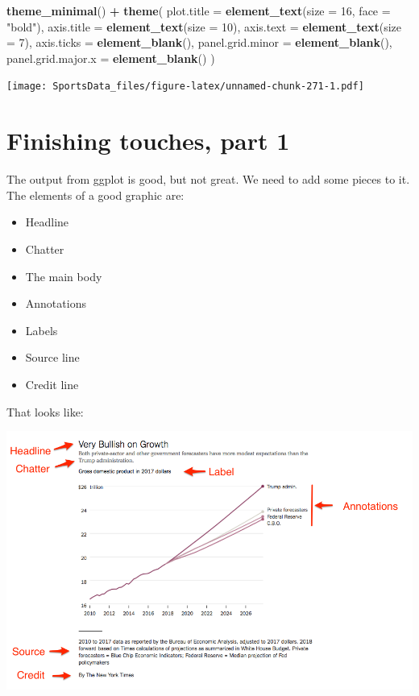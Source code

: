 \documentclass[
]{book}
\newenvironment{Shaded}{\begin{snugshade}}{\end{snugshade}}
\newcommand{\DataTypeTok}[1]{\textcolor[rgb]{0.13,0.29,0.53}{#1}}
\newcommand{\DecValTok}[1]{\textcolor[rgb]{0.00,0.00,0.81}{#1}}
\newcommand{\KeywordTok}[1]{\textcolor[rgb]{0.13,0.29,0.53}{\textbf{#1}}}
\newcommand{\NormalTok}[1]{#1}
\newcommand{\OperatorTok}[1]{\textcolor[rgb]{0.81,0.36,0.00}{\textbf{#1}}}
\newcommand{\StringTok}[1]{\textcolor[rgb]{0.31,0.60,0.02}{#1}}
\providecommand{\tightlist}{%
  \setlength{\itemsep}{0pt}\setlength{\parskip}{0pt}}
\begin{document}
\begin{Shaded}
\begin{Highlighting}[]
\StringTok{  }\KeywordTok{theme_minimal}\NormalTok{() }\OperatorTok{+}\StringTok{ }
\StringTok{  }\KeywordTok{theme}\NormalTok{(}
    \DataTypeTok{plot.title =} \KeywordTok{element_text}\NormalTok{(}\DataTypeTok{size =} \DecValTok{16}\NormalTok{, }\DataTypeTok{face =} \StringTok{"bold"}\NormalTok{),}
    \DataTypeTok{axis.title =} \KeywordTok{element_text}\NormalTok{(}\DataTypeTok{size =} \DecValTok{10}\NormalTok{),}
    \DataTypeTok{axis.text =} \KeywordTok{element_text}\NormalTok{(}\DataTypeTok{size =} \DecValTok{7}\NormalTok{),}
    \DataTypeTok{axis.ticks =} \KeywordTok{element_blank}\NormalTok{(),}
    \DataTypeTok{panel.grid.minor =} \KeywordTok{element_blank}\NormalTok{(),}
    \DataTypeTok{panel.grid.major.x =} \KeywordTok{element_blank}\NormalTok{()}
\NormalTok{  )}
\end{Highlighting}
\end{Shaded}

\texttt{[image: SportsData\_files/figure-latex/unnamed-chunk-271-1.pdf]}

\hypertarget{finishing-touches-part-1}{%
\chapter{Finishing touches, part 1}\label{finishing-touches-part-1}}

The output from ggplot is good, but not great. We need to add some pieces to it. The elements of a good graphic are:

\begin{itemize}
\tightlist
\item
  Headline
\item
  Chatter
\item
  The main body
\item
  Annotations
\item
  Labels
\item
  Source line
\item
  Credit line
\end{itemize}

That looks like:

\includegraphics[width=12.97in]{images/chartannotated}
\end{document}

